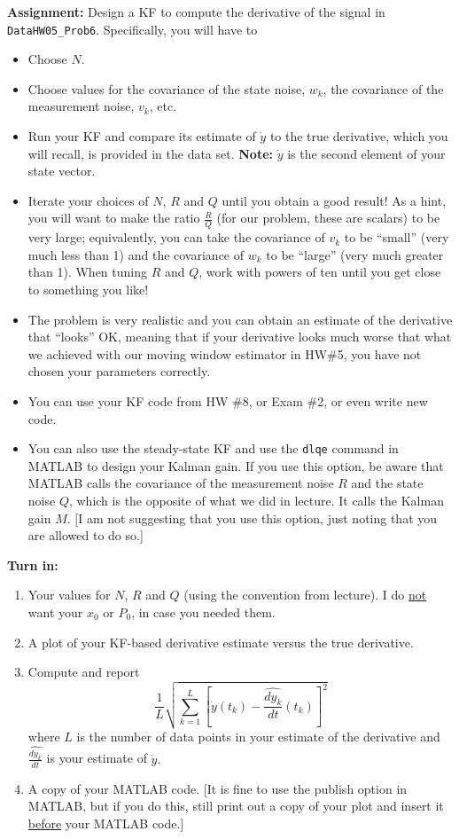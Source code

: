 \documentclass[letterpaper]{article}
\begin{document}
\textbf{Assignment:} Design a KF to compute the derivative of the signal in \texttt{DataHW05\_Prob6}. Specifically, you will have to
\begin{itemize}
\setlength{\itemsep}{.1cm}
\item Choose $N$.
\item Choose values for the covariance of the state noise, $w_k$,  the covariance of the measurement noise, $v_k$, etc.
\item Run your KF and compare its estimate of $\dot{y}$  to the true derivative, which you will recall, is provided in the data set. \textbf{Note:} $\dot{y}$ is the second element of your state vector.
    \item Iterate your choices of $N$, $R$ and $Q$ until you obtain a good result! As a hint, you will want to make the ratio $\frac{R}{Q}$ (for our problem, these are scalars) to be very large; equivalently, you can take the covariance of $v_k$ to be ``small'' (very much less than 1) and the covariance of $w_k$ to be ``large'' (very much greater than 1).  When tuning $R$ and $Q$, work with powers of ten until you get close to something you like!

        \item The problem is very realistic and you can obtain an estimate of the derivative that ``looks'' OK, meaning that if your derivative looks much worse that what we achieved with our moving window estimator in HW\#5, you have not chosen your parameters correctly.
        \item You can use your KF code from HW \#8, or Exam \#2,  or even write new code.
        \item You can also use the steady-state KF and use the \texttt{dlqe} command in MATLAB to design your Kalman gain. If you use this option, be aware that MATLAB calls the covariance of the measurement noise $R$ and the state noise $Q$, which is the opposite of what we did in lecture. It calls the Kalman gain $M$. [I am not suggesting that you use this option, just noting that you are allowed to do so.]
\end{itemize}

\newpage
\textbf{Turn in:}
 \begin{enumerate}
\renewcommand{\labelenumi}{(\alph{enumi})}
\setlength{\itemsep}{.1in}
\item Your values for $N$, $R$ and $Q$ (using the convention from lecture). I do \underline{not} want your $x_0$ or $P_0$, in case you needed them.
\item A plot of your KF-based derivative estimate versus the true derivative.
\item Compute and report $$\frac{1}{L} \sqrt{\sum_{k=1}^{L} \left[\dot{y}(t_k) - \widehat{\frac{dy_k}{dt}}(t_k) \right]^2} $$
            where $L$ is the number of data points in your estimate of the derivative and $\widehat{\frac{dy_k}{dt}}$ is your estimate of $\dot{y}.$
\item A copy of your MATLAB code. [It is fine to use the publish option in MATLAB, but if you do this, still print out a copy of your plot and insert it \underline{before} your MATLAB code.]
\end{enumerate}
\end{document}
